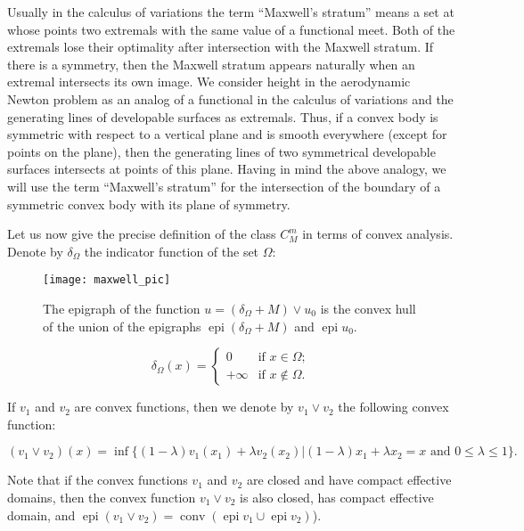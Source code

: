 \documentclass[14pt]{extarticle}
\renewcommand{\le}{\leqslant}
\DeclareMathOperator{\epi}{\mathrm{epi}}
\DeclareMathOperator{\conv}{\mathrm{conv}}
\theoremstyle{remark}
\theoremstyle{definition}
\begin{document}
Usually in the calculus of variations the term ``Maxwell's stratum'' means a set at whose points two extremals with the same value of a functional meet. Both of the extremals lose their optimality after intersection with the Maxwell stratum. If there is a symmetry, then the Maxwell stratum appears naturally when an extremal intersects its own image. We consider height in the aerodynamic Newton problem as an analog of a functional in the calculus of variations and the generating lines of developable surfaces as extremals. Thus, if a convex body is symmetric with respect to a vertical plane and is smooth everywhere (except for points on the plane), then the generating lines of two symmetrical developable surfaces intersects at points of this plane. Having in mind the above analogy, we will use the term ``Maxwell's stratum'' for the intersection of the boundary of a symmetric convex body with its plane of symmetry.

Let us now give the precise definition of the class $C_M^m$ in terms of convex analysis. Denote by $\delta_\Omega$ the indicator function of the set $\Omega$:


\begin{figure}
  \begin{center}
    \texttt{[image: maxwell\_pic]}
  \end{center}
  \caption{The epigraph of the function $u = (\delta_\Omega + M)\vee u_0$ is the convex hull of the union of the epigraphs $\epi(\delta_\Omega + M)$ and $\epi u_0$.}
  \label{fig:maxwell}
\end{figure}



\[
	\delta_\Omega (x)= \left\{\begin{array}{ll}
		0&\mbox{if }x\in\Omega;\\
		+\infty&\mbox{if }x\not\in\Omega.
	\end{array}\right.
\]

\noindent If $v_1$ and $v_2$ are convex functions, then we denote by $v_1\vee v_2$ the following convex function:

\[
	(v_1\vee v_2)(x) = \inf\{(1-\lambda)v_1(x_1) + \lambda v_2(x_2)|(1-\lambda)x_1 + \lambda x_2 = x\mbox{ and }0\le\lambda\le 1\}.
\]

\noindent Note that if the convex functions $v_1$ and $v_2$ are closed and have compact effective domains, then the convex function $v_1\vee v_2$ is also closed, has compact effective domain, and $\epi (v_1 \vee v_2) = \conv(\epi v_1 \cup \epi v_2)$).
\end{document}

